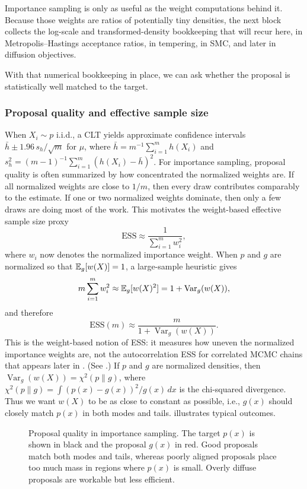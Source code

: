 Importance sampling is only as useful as the weight computations behind it.
Because those weights are ratios of potentially tiny densities, the next block collects the log-scale and transformed-density bookkeeping that will recur here, in Metropolis--Hastings acceptance ratios, in tempering, in SMC, and later in diffusion objectives.

With that numerical bookkeeping in place, we can ask whether the proposal is statistically well matched to the target.

\subsubsection{Proposal quality and effective sample size}
\label{subsubsec:proposal-quality-and-ess}
When $X_i \sim p$ i.i.d., a CLT yields approximate confidence intervals
$\bar h \pm 1.96\, s_h/\sqrt{m}$ for $\mu$, where
$\bar h = m^{-1}\sum_{i=1}^m h(X_i)$ and
$s_h^2 = (m-1)^{-1}\sum_{i=1}^m (h(X_i)-\bar h)^2$.
For importance sampling, proposal quality is often summarized by how concentrated the normalized weights are.
If all normalized weights are close to $1/m$, then every draw contributes comparably to the estimate.
If one or two normalized weights dominate, then only a few draws are doing most of the work.
This motivates the weight-based effective sample size proxy
\[
  \mathrm{ESS} \approx \frac{1}{\sum_{i=1}^m w_i^2},
\]
where $w_i$ now denotes the normalized importance weight.
When $p$ and $g$ are normalized so that $\mathbb{E}_g[w(X)]=1$, a large-sample heuristic gives
\[
  m\sum_{i=1}^m w_i^2 \approx \mathbb{E}_g[w(X)^2] = 1+\operatorname{Var}_g(w(X)),
\]
and therefore
\[
  \mathrm{ESS}(m) \approx \frac{m}{1+\operatorname{Var}_g(w(X))}.
\]
This is the weight-based notion of ESS: it measures how uneven the normalized importance weights are, not the autocorrelation ESS for correlated MCMC chains that appears later in .
(See \citet[\S2.5.3]{liu_2002_monte_carlo}.)
If $p$ and $g$ are normalized densities, then $\operatorname{Var}_g(w(X))=\chi^2(p\|g)$, where $\chi^2(p\|g)=\int (p(x)-g(x))^2/g(x)\,dx$ is the chi-squared divergence.
Thus we want $w(X)$ to be as close to constant as possible, i.e., $g(x)$ should closely match $p(x)$ in both modes and tails.
 illustrates typical outcomes.

\begin{figure}[t]
  \centering
  
\caption{Proposal quality in importance sampling.
  The target $p(x)$ is shown in black and the proposal $g(x)$ in red.
  Good proposals match both modes and tails, whereas poorly aligned proposals place too much mass in regions where $p(x)$ is small.
  Overly diffuse proposals are workable but less efficient.}
  \label{fig:is-proposal-quality}
\end{figure}

